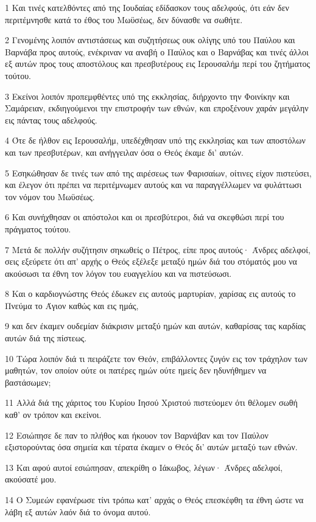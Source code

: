 \par 1 Και τινές κατελθόντες από της Ιουδαίας εδίδασκον τους αδελφούς, ότι εάν δεν περιτέμνησθε κατά το έθος του Μωϋσέως, δεν δύνασθε να σωθήτε.
\par 2 Γενομένης λοιπόν αντιστάσεως και συζητήσεως ουκ ολίγης υπό του Παύλου και Βαρνάβα προς αυτούς, ενέκριναν να αναβή ο Παύλος και ο Βαρνάβας και τινές άλλοι εξ αυτών προς τους αποστόλους και πρεσβυτέρους εις Ιερουσαλήμ περί του ζητήματος τούτου.
\par 3 Εκείνοι λοιπόν προπεμφθέντες υπό της εκκλησίας, διήρχοντο την Φοινίκην και Σαμάρειαν, εκδιηγούμενοι την επιστροφήν των εθνών, και επροξένουν χαράν μεγάλην εις πάντας τους αδελφούς.
\par 4 Ότε δε ήλθον εις Ιερουσαλήμ, υπεδέχθησαν υπό της εκκλησίας και των αποστόλων και των πρεσβυτέρων, και ανήγγειλαν όσα ο Θεός έκαμε δι' αυτών.
\par 5 Εσηκώθησαν δε τινές των από της αιρέσεως των Φαρισαίων, οίτινες είχον πιστεύσει, και έλεγον ότι πρέπει να περιτέμνωμεν αυτούς και να παραγγέλλωμεν να φυλάττωσι τον νόμον του Μωϋσέως.
\par 6 Και συνήχθησαν οι απόστολοι και οι πρεσβύτεροι, διά να σκεφθώσι περί του πράγματος τούτου.
\par 7 Μετά δε πολλήν συζήτησιν σηκωθείς ο Πέτρος, είπε προς αυτούς· Άνδρες αδελφοί, σεις εξεύρετε ότι απ' αρχής ο Θεός εξέλεξε μεταξύ ημών διά του στόματός μου να ακούσωσι τα έθνη τον λόγον του ευαγγελίου και να πιστεύσωσι.
\par 8 Και ο καρδιογνώστης Θεός έδωκεν εις αυτούς μαρτυρίαν, χαρίσας εις αυτούς το Πνεύμα το Άγιον καθώς και εις ημάς,
\par 9 και δεν έκαμεν ουδεμίαν διάκρισιν μεταξύ ημών και αυτών, καθαρίσας τας καρδίας αυτών διά της πίστεως.
\par 10 Τώρα λοιπόν διά τι πειράζετε τον Θεόν, επιβάλλοντες ζυγόν εις τον τράχηλον των μαθητών, τον οποίον ούτε οι πατέρες ημών ούτε ημείς δεν ηδυνήθημεν να βαστάσωμεν;
\par 11 Αλλά διά της χάριτος του Κυρίου Ιησού Χριστού πιστεύομεν ότι θέλομεν σωθή καθ' ον τρόπον και εκείνοι.
\par 12 Εσιώπησε δε παν το πλήθος και ήκουον τον Βαρνάβαν και τον Παύλον εξιστορούντας όσα σημεία και τέρατα έκαμεν ο Θεός δι' αυτών μεταξύ των εθνών.
\par 13 Και αφού αυτοί εσιώπησαν, απεκρίθη ο Ιάκωβος, λέγων· Άνδρες αδελφοί, ακούσατέ μου.
\par 14 Ο Συμεών εφανέρωσε τίνι τρόπω κατ' αρχάς ο Θεός επεσκέφθη τα έθνη ώστε να λάβη εξ αυτών λαόν διά το όνομα αυτού.
